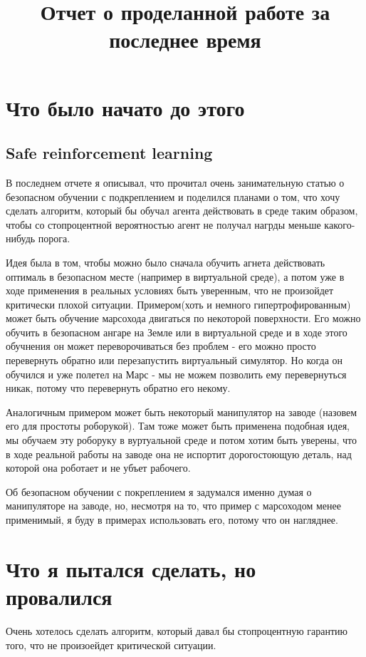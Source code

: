 \documentclass[a4paper]{article}
\begin{document}
\title{Отчет о проделанной работе за последнее время}

\maketitle 
\section{Что было начато до этого}
\subsection{Safe reinforcement learning}
В последнем отчете я описывал, что прочитал очень занимательную статью о безопасном обучении с подкреплением и поделился планами о том, что хочу сделать алгоритм, который бы обучал агента действовать в среде таким образом, чтобы со стопроцентной вероятностью агент не получал нагрды меньше какого-нибудь порога.

Идея была в том, чтобы можно было сначала обучить агнета действовать оптималь в безопасном месте (например в виртуальной среде), а потом уже в ходе применения в реальных условиях быть уверенным, что не произойдет критически плохой ситуации. Примером(хоть и немного гипертрофированным) может быть обучение марсохода двигаться по некоторой поверхности. Его можно обучить в безопасном ангаре на Земле или в виртуальной среде и в ходе этого обучнения он может переворочиваться без проблем - его можно просто перевернуть обратно или перезапустить виртуальный симулятор. Но когда он обучился и уже полетел на Марс - мы не можем позволить ему перевернуться никак, потому что перевернуть обратно его некому.

Аналогичным примером может быть некоторый манипулятор на заводе (назовем его для простоты роборукой). Там тоже может быть применена подобная идея, мы обучаем эту роборуку в вуртуальной среде и потом хотим быть уверены, что в ходе реальной работы на заводе она не испортит дорогостоющую деталь, над которой она роботает и не убъет рабочего. 

Об безопасном обучении с покреплением я задумался именно думая о манипуляторе на заводе, но, несмотря на то, что пример с марсоходом менее применимый, я буду в примерах использовать его, потому что он нагляднее.

\section{Что я пытался сделать, но провалился}
Очень хотелось сделать алгоритм, который давал бы стопроцентную гарантию того, что не произоейдет критической ситуации. 
\end{document}
